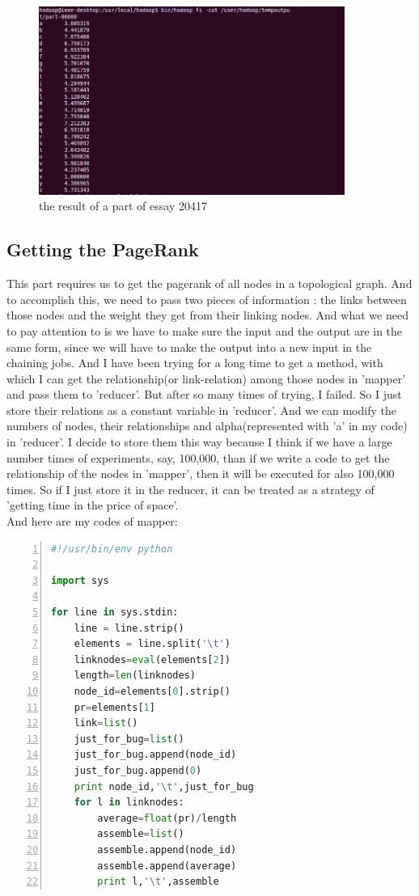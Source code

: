 \documentclass{article}
\begin{document}
\begin{figure}[htbp]
\centering
\includegraphics[width=10cm]{20417.png}
\caption{the result of a part of essay 20417}
\end{figure}
\subsection{Getting the PageRank}
This part requires us to get the pagerank of all nodes in a topological graph. And to accomplish this, we need to pass two pieces of information : the links between those nodes and the weight they get from their linking nodes. And what we need to pay attention to is we have to make sure the input and the output are in the same form, since we will have to make the output into a new input in the chaining jobs. And I have been trying for a long time to get a method, with which I can get the relationship(or link-relation) among those nodes in 'mapper' and pass them to 'reducer'. But after so many times of trying, I failed. So I just store their relations as a constant variable in 'reducer'. And we can modify the numbers of nodes, their relationships and alpha(represented with 'a' in my code) in 'reducer'. I decide to store them this way because I think if we have a large number times of experiments, say, 100,000, than if we write a code to get the relationship of the nodes in 'mapper', then it will be executed for also 100,000 times. So if I just store it in the reducer, it can be treated as a strategy of 'getting time in the price of space'.\\
And here are my codes of mapper:
\begin{lstlisting}[language=python,numbers=left,frame=leftline]
#!/usr/bin/env python

import sys

for line in sys.stdin:
    line = line.strip()
    elements = line.split('\t')
    linknodes=eval(elements[2])
    length=len(linknodes)
    node_id=elements[0].strip()
    pr=elements[1]
    link=list()
    just_for_bug=list()
    just_for_bug.append(node_id)
    just_for_bug.append(0)
    print node_id,'\t',just_for_bug
    for l in linknodes:
    	average=float(pr)/length
    	assemble=list()
    	assemble.append(node_id)
    	assemble.append(average)
        print l,'\t',assemble

\end{lstlisting}
\end{document}

